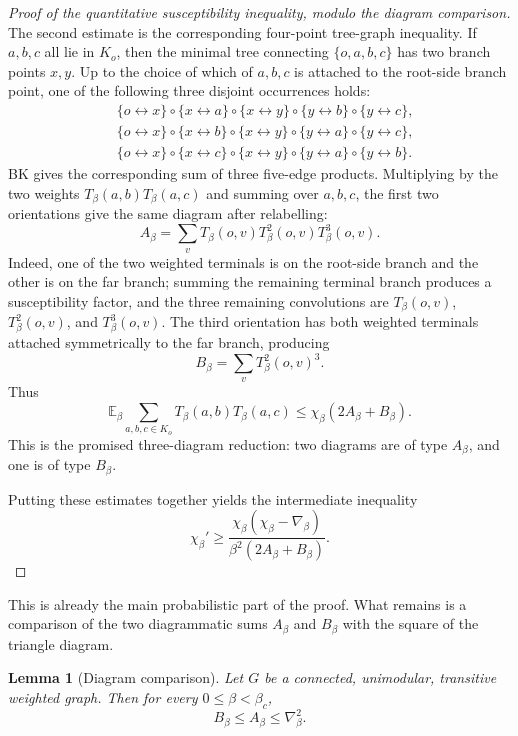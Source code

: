 \documentclass[11pt,reqno]{book}
\numberwithin{equation}{chapter}
\theoremstyle{plain}
\newtheorem{lemma}[theorem]{Lemma}
\theoremstyle{definition}
\theoremstyle{remark}
\newcommand{\E}{\mathbb E}
\newcommand{\1}{\mathbf 1}
\begin{document}
\begin{proof}[Proof of the quantitative susceptibility inequality, modulo the diagram comparison]
The second estimate is the corresponding four-point tree-graph inequality.
If \(a,b,c\) all lie in \(K_o\), then the minimal tree connecting
\(\{o,a,b,c\}\) has two branch points \(x,y\). Up to the choice of which of
\(a,b,c\) is attached to the root-side branch point, one of the following
three disjoint occurrences holds:
\[
\begin{aligned}
&\{o\leftrightarrow x\}\circ\{x\leftrightarrow a\}\circ
  \{x\leftrightarrow y\}\circ
  \{y\leftrightarrow b\}\circ\{y\leftrightarrow c\},\\
&\{o\leftrightarrow x\}\circ\{x\leftrightarrow b\}\circ
  \{x\leftrightarrow y\}\circ
  \{y\leftrightarrow a\}\circ\{y\leftrightarrow c\},\\
&\{o\leftrightarrow x\}\circ\{x\leftrightarrow c\}\circ
  \{x\leftrightarrow y\}\circ
  \{y\leftrightarrow a\}\circ\{y\leftrightarrow b\}.
\end{aligned}
\]
BK gives the corresponding sum of three five-edge products. Multiplying by
the two weights \(T_\beta(a,b)T_\beta(a,c)\) and summing over \(a,b,c\), the
first two orientations give the same diagram after relabelling:
\[
  A_\beta
  =
  \sum_v
  T_\beta(o,v)T_\beta^2(o,v)T_\beta^3(o,v).
\]
Indeed, one of the two weighted terminals is on the root-side branch and the
other is on the far branch; summing the remaining terminal branch produces a
susceptibility factor, and the three remaining convolutions are
\(T_\beta(o,v)\), \(T_\beta^2(o,v)\), and \(T_\beta^3(o,v)\). The third
orientation has both weighted terminals attached symmetrically to the far
branch, producing
\[
  B_\beta
  =
  \sum_v T_\beta^2(o,v)^3.
\]
Thus
\[
  \E_\beta\sum_{a,b,c\in K_o}T_\beta(a,b)T_\beta(a,c)
  \leq
  \chi_\beta(2A_\beta+B_\beta).
\]
This is the promised three-diagram reduction: two diagrams are of type
\(A_\beta\), and one is of type \(B_\beta\).

Putting these estimates together yields the intermediate inequality
\[
  \chi_\beta'
  \geq
  \frac{\chi_\beta(\chi_\beta-\nabla_\beta)}
       {\beta^2(2A_\beta+B_\beta)}.
\]
\end{proof}

This is already the main probabilistic part of the proof. What remains is a comparison of the two diagrammatic sums \(A_\beta\) and \(B_\beta\) with the square of the triangle diagram.

\begin{lemma}[Diagram comparison]
Let \(G\) be a connected, unimodular, transitive weighted graph. Then for every \(0\leq\beta<\beta_c\),
\[
  B_\beta\leq A_\beta\leq \nabla_\beta^2.
\]
\end{lemma}
\end{document}
